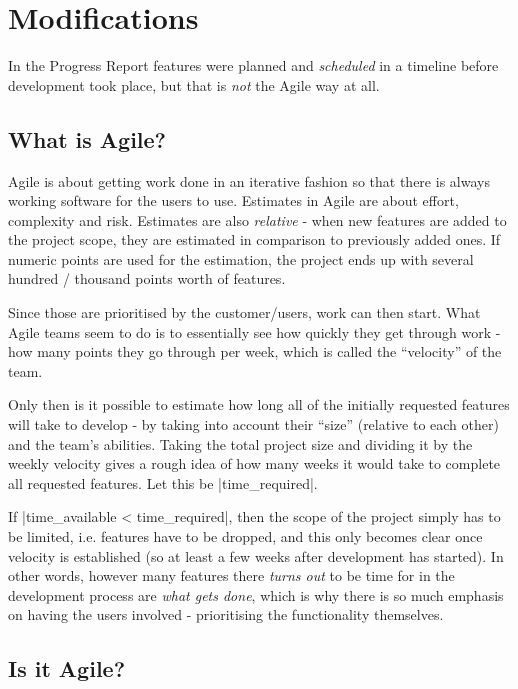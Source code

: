 \section{Modifications}
In the Progress Report features were planned and \emph{scheduled} in a timeline before development took place, but that is \emph{not} the Agile way at all.

\subsection{What is Agile?}
Agile is about getting work done in an iterative fashion so that there is always working software for the users to use. Estimates in Agile are about effort, complexity and risk. Estimates are also \emph{relative} - when new features are added to the project scope, they are estimated in comparison to previously added ones. If numeric points are used for the estimation, the project ends up with several hundred / thousand points worth of features.

Since those are prioritised by the customer/users, work can then start. What Agile teams seem to do is to essentially see how quickly they get through work - how many points they go through per week, which is called the ``velocity'' of the team.

Only then is it possible to estimate how long all of the initially requested features will take to develop - by taking into account their ``size'' (relative to each other) and the team's abilities. Taking the total project size and dividing it by the weekly velocity gives a rough idea of how many weeks it would take to complete all requested features. Let this be |time_required|.

If |time_available < time_required|, then the scope of the project simply has to be limited, i.e. features have to be dropped, and this only becomes clear once velocity is established (so at least a few weeks after development has started). In other words, however many features there \emph{turns out} to be time for in the development process are \emph{what gets done}, which is why there is so much emphasis on having the users involved - prioritising the functionality themselves.

\subsection{Is it Agile?}

